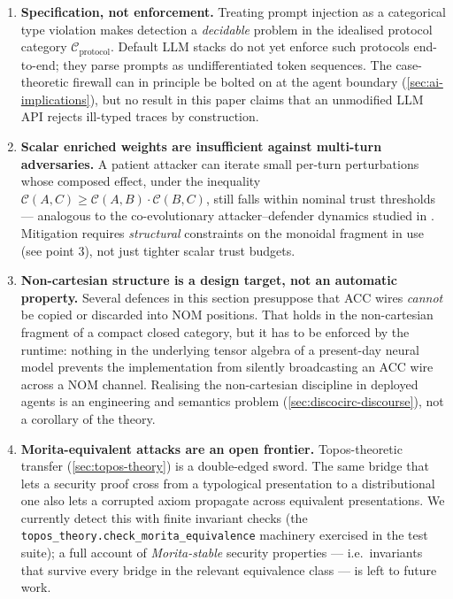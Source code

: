 \documentclass[
]{article}
\begin{document}
\begin{enumerate}
\def\labelenumi{\arabic{enumi}.}
\item
  \textbf{Specification, not enforcement.} Treating prompt injection as
  a categorical type violation makes detection a \emph{decidable}
  problem in the idealised protocol category
  \(\mathcal{C}_{\text{protocol}}\). Default LLM stacks do not yet
  enforce such protocols end-to-end; they parse prompts as
  undifferentiated token sequences. The case-theoretic firewall can in
  principle be bolted on at the agent boundary
  (\autoref{sec:ai-implications}), but no result in this paper claims
  that an unmodified LLM API rejects ill-typed traces by construction.
\item
  \textbf{Scalar enriched weights are insufficient against multi-turn
  adversaries.} A patient attacker can iterate small per-turn
  perturbations whose composed effect, under the inequality
  \(\mathcal{C}(A,C)\geq \mathcal{C}(A,B)\cdot \mathcal{C}(B,C)\), still
  falls within nominal trust thresholds --- analogous to the
  co-evolutionary attacker--defender dynamics studied in
  \citep{arlas2025adversarial}. Mitigation requires \emph{structural}
  constraints on the monoidal fragment in use (see point 3), not just
  tighter scalar trust budgets.
\item
  \textbf{Non-cartesian structure is a design target, not an automatic
  property.} Several defences in this section presuppose that ACC wires
  \emph{cannot} be copied or discarded into NOM positions. That holds in
  the non-cartesian fragment of a compact closed category, but it has to
  be enforced by the runtime: nothing in the underlying tensor algebra
  of a present-day neural model prevents the implementation from
  silently broadcasting an ACC wire across a NOM channel. Realising the
  non-cartesian discipline in deployed agents is an engineering and
  semantics problem (\autoref{sec:discocirc-discourse}), not a corollary
  of the theory.
\item
  \textbf{Morita-equivalent attacks are an open frontier.}
  Topos-theoretic transfer (\autoref{sec:topos-theory}) is a
  double-edged sword. The same bridge that lets a security proof cross
  from a typological presentation to a distributional one also lets a
  corrupted axiom propagate across equivalent presentations. We
  currently detect this with finite invariant checks (the
  \texttt{topos\_theory.check\_morita\_equivalence} machinery exercised
  in the test suite); a full account of \emph{Morita-stable} security
  properties --- i.e.~invariants that survive every bridge in the
  relevant equivalence class --- is left to future work.
\end{enumerate}
\end{document}
